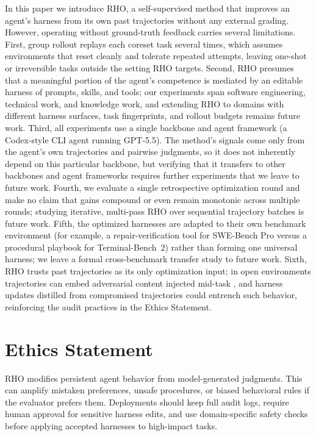 \documentclass[11pt]{article}
\newcommand{\method}{\textsc{RHO}}
\begin{document}
In this paper we introduce \method{}, a self-supervised method that improves an agent's harness from its own past trajectories without any external grading.
However, operating without ground-truth feedback carries several limitations.
First, group rollout replays each coreset task several times, which assumes environments that reset cleanly and tolerate repeated attempts, leaving one-shot or irreversible tasks outside the setting \method{} targets.
Second, \method{} presumes that a meaningful portion of the agent's competence is mediated by an editable harness of prompts, skills, and tools; our experiments span software engineering, technical work, and knowledge work, and extending \method{} to domains with different harness surfaces, task fingerprints, and rollout budgets remains future work.
Third, all experiments use a single backbone and agent framework (a Codex-style CLI agent running GPT-5.5). The method's signals come only from the agent's own trajectories and pairwise judgments, so it does not inherently depend on this particular backbone, but verifying that it transfers to other backbones and agent frameworks requires further experiments that we leave to future work.
Fourth, we evaluate a single retrospective optimization round and make no claim that gains compound or even remain monotonic across multiple rounds; studying iterative, multi-pass \method{} over sequential trajectory batches is future work.
Fifth, the optimized harnesses are adapted to their own benchmark environment (for example, a repair-verification tool for SWE-Bench Pro versus a procedural playbook for Terminal-Bench~2) rather than forming one universal harness; we leave a formal cross-benchmark transfer study to future work.
Sixth, \method{} trusts past trajectories as its only optimization input; in open environments trajectories can embed adversarial content injected mid-task \citep{liu2026webtrap}, and harness updates distilled from compromised trajectories could entrench such behavior, reinforcing the audit practices in the Ethics Statement.

\section*{Ethics Statement}

\method{} modifies persistent agent behavior from model-generated judgments.
This can amplify mistaken preferences, unsafe procedures, or biased behavioral rules if the evaluator prefers them.
Deployments should keep full audit logs, require human approval for sensitive harness edits, and use domain-specific safety checks before applying accepted harnesses to high-impact tasks.
\end{document}

